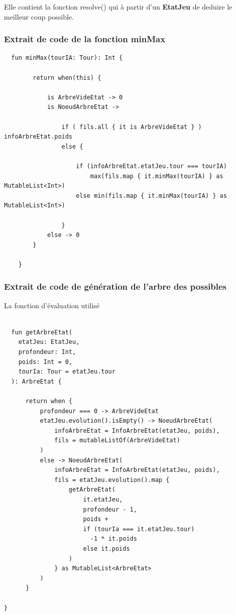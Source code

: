 \documentclass{article}
\begin{document}
  Elle contient la fonction resolve() qui à partir d'un \textbf{EtatJeu} 
  de deduire le meilleur coup possible.

\subsubsection{Extrait de code de la fonction minMax}

\begin{verbatim}
  fun minMax(tourIA: Tour): Int {

        return when(this) {

            is ArbreVideEtat -> 0
            is NoeudArbreEtat ->

                if ( fils.all { it is ArbreVideEtat } ) infoArbreEtat.poids
                else {

                    if (infoArbreEtat.etatJeu.tour === tourIA) 
                        max(fils.map { it.minMax(tourIA) } as MutableList<Int>)
                    else min(fils.map { it.minMax(tourIA) } as MutableList<Int>)

                }
            else -> 0
        }

    }

\end{verbatim}

\subsubsection{Extrait de code de génération de l'arbre des possibles}

La fonction d'évaluation utilisé 

\begin{verbatim}

  fun getArbreEtat(
    etatJeu: EtatJeu,
    profondeur: Int,
    poids: Int = 0,
    tourIa: Tour = etatJeu.tour
  ): ArbreEtat {

      return when {
          profondeur === 0 -> ArbreVideEtat
          etatJeu.evolution().isEmpty() -> NoeudArbreEtat(
              infoArbreEtat = InfoArbreEtat(etatJeu, poids), 
              fils = mutableListOf(ArbreVideEtat)
          )
          else -> NoeudArbreEtat(
              infoArbreEtat = InfoArbreEtat(etatJeu, poids),
              fils = etatJeu.evolution().map {
                  getArbreEtat(
                      it.etatJeu,
                      profondeur - 1,
                      poids + 
                      if (tourIa === it.etatJeu.tour) 
                        -1 * it.poids 
                      else it.poids
                  )
              } as MutableList<ArbreEtat>
          )
      }

}

\end{verbatim}
\end{document}
